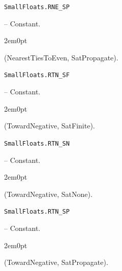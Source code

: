 \par\medskip\noindent\begin{minipage}{\linewidth}
\hypertarget{4678886371087216428}{\texttt{SmallFloats.RNE\_\allowbreak{}SP}}  -- {Constant.}
\nopagebreak
\begin{adjustwidth}{2em}{0pt}

(NearestTiesToEven, SatPropagate).



\end{adjustwidth}
\end{minipage}
\par\medskip

\par\medskip\noindent\begin{minipage}{\linewidth}
\hypertarget{5549571836457789421}{\texttt{SmallFloats.RTN\_\allowbreak{}SF}}  -- {Constant.}
\nopagebreak
\begin{adjustwidth}{2em}{0pt}

(TowardNegative, SatFinite).



\end{adjustwidth}
\end{minipage}
\par\medskip

\par\medskip\noindent\begin{minipage}{\linewidth}
\hypertarget{16640126877541699580}{\texttt{SmallFloats.RTN\_\allowbreak{}SN}}  -- {Constant.}
\nopagebreak
\begin{adjustwidth}{2em}{0pt}

(TowardNegative, SatNone).



\end{adjustwidth}
\end{minipage}
\par\medskip

\par\medskip\noindent\begin{minipage}{\linewidth}
\hypertarget{4658287144677563280}{\texttt{SmallFloats.RTN\_\allowbreak{}SP}}  -- {Constant.}
\nopagebreak
\begin{adjustwidth}{2em}{0pt}

(TowardNegative, SatPropagate).



\end{adjustwidth}
\end{minipage}
\par\medskip

